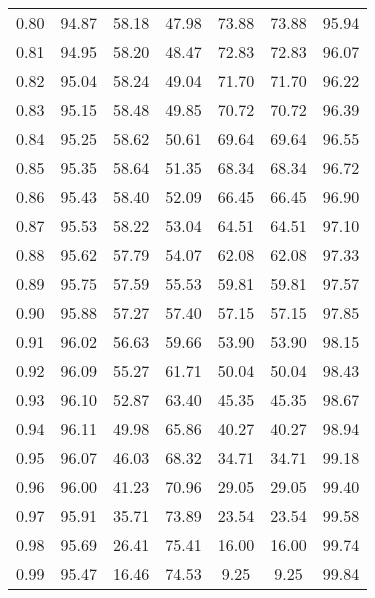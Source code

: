 \begin{tabular}{|c|c|c|c|c|c|c|}
      0.80 &     94.87 &     58.18 &      47.98 &   73.88 &      73.88 &         95.94 \\
      0.81 &     94.95 &     58.20 &      48.47 &   72.83 &      72.83 &         96.07 \\
      0.82 &     95.04 &     58.24 &      49.04 &   71.70 &      71.70 &         96.22 \\
      0.83 &     95.15 &     58.48 &      49.85 &   70.72 &      70.72 &         96.39 \\
      0.84 &     95.25 &     58.62 &      50.61 &   69.64 &      69.64 &         96.55 \\
      0.85 &     95.35 &     58.64 &      51.35 &   68.34 &      68.34 &         96.72 \\
      0.86 &     95.43 &     58.40 &      52.09 &   66.45 &      66.45 &         96.90 \\
      0.87 &     95.53 &     58.22 &      53.04 &   64.51 &      64.51 &         97.10 \\
      0.88 &     95.62 &     57.79 &      54.07 &   62.08 &      62.08 &         97.33 \\
      0.89 &     95.75 &     57.59 &      55.53 &   59.81 &      59.81 &         97.57 \\
      0.90 &     95.88 &     57.27 &      57.40 &   57.15 &      57.15 &         97.85 \\
      0.91 &     96.02 &     56.63 &      59.66 &   53.90 &      53.90 &         98.15 \\
      0.92 &     96.09 &     55.27 &      61.71 &   50.04 &      50.04 &         98.43 \\
      0.93 &     96.10 &     52.87 &      63.40 &   45.35 &      45.35 &         98.67 \\
      0.94 &     96.11 &     49.98 &      65.86 &   40.27 &      40.27 &         98.94 \\
      0.95 &     96.07 &     46.03 &      68.32 &   34.71 &      34.71 &         99.18 \\
      0.96 &     96.00 &     41.23 &      70.96 &   29.05 &      29.05 &         99.40 \\
      0.97 &     95.91 &     35.71 &      73.89 &   23.54 &      23.54 &         99.58 \\
      0.98 &     95.69 &     26.41 &      75.41 &   16.00 &      16.00 &         99.74 \\
      0.99 &     95.47 &     16.46 &      74.53 &    9.25 &       9.25 &         99.84 \\
\bottomrule
\end{tabular}
